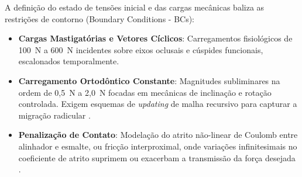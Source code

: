 A definição do estado de tensões inicial e das cargas mecânicas baliza as restrições de contorno (Boundary Conditions - BCs):
\begin{itemize}
    \item \textbf{Cargas Mastigatórias e Vetores Cíclicos}: Carregamentos fisiológicos de 100~N a 600~N incidentes sobre eixos oclusais e cúspides funcionais, escalonados temporalmente.
    \item \textbf{Carregamento Ortodôntico Constante}: Magnitudes subliminares na ordem de 0,5~N a 2,0~N focadas em mecânicas de inclinação e rotação controlada. Exigem esquemas de \textit{updating} de malha recursivo para capturar a migração radicular \cite{zhang2024recursive}.
    \item \textbf{Penalização de Contato}: Modelação do atrito não-linear de Coulomb entre alinhador e esmalte, ou fricção interproximal, onde variações infinitesimais no coeficiente de atrito suprimem ou exacerbam a transmissão da força desejada \cite{li2025impacts}.
\end{itemize}
